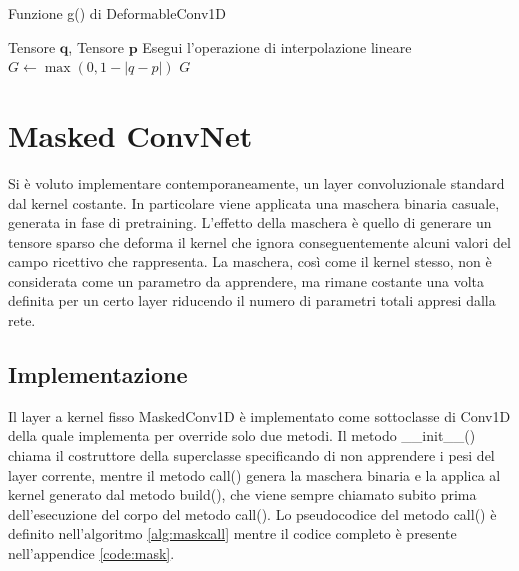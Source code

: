 \documentclass[12pt,a4paper]{report}
\begin{document}
    \begin{algorithm}[t] 
        \caption{Funzione g() di DeformableConv1D}
        \begin{algorithmic} \label{alg:defg}
            \REQUIRE Tensore $\boldsymbol{q}$, Tensore $\boldsymbol{p}$
            \STATE Esegui l'operazione di interpolazione lineare 
            $G\gets\max(0, 1-|q-p|)$
            \RETURN $G$
        \end{algorithmic}
    \end{algorithm}

    \section{Masked ConvNet} \label{sec:mask}
    Si \`e voluto implementare contemporaneamente, un layer 
    convoluzionale standard dal kernel costante. In particolare viene 
    applicata una maschera binaria casuale, generata in fase di 
    pretraining. L'effetto della maschera \`e quello di generare un 
    tensore sparso che deforma il kernel che ignora conseguentemente 
    alcuni valori del campo ricettivo che rappresenta. 
    La maschera, cos\`i come il kernel stesso, non \`e considerata come
    un parametro da apprendere, ma rimane costante una volta definita 
    per un certo layer riducendo il numero di parametri totali appresi
    dalla rete.

    \subsection{Implementazione}
    Il layer a kernel fisso MaskedConv1D \`e implementato come sottoclasse di Conv1D
    della quale implementa per override solo due metodi. Il metodo \_\_init\_\_() 
    chiama il costruttore della superclasse specificando di non apprendere i pesi
    del layer corrente, mentre il metodo call() genera la maschera binaria e la 
    applica al kernel generato dal metodo build(), che viene sempre chiamato subito
    prima dell'esecuzione del corpo del metodo call(). Lo pseudocodice del metodo
    call() \`e definito nell'algoritmo \ref{alg:maskcall} mentre il codice completo
    \`e presente nell'appendice \ref{code:mask}.
\end{document}
